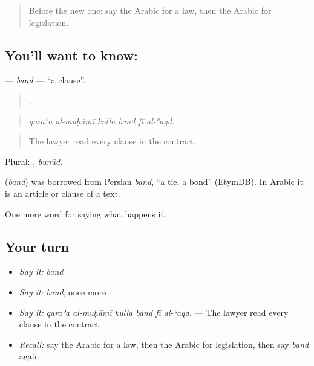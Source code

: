 \label{lesson:AR-C409-band}



\begin{quote}
Before the new one: say the Arabic for a law, then the Arabic for legislation.
\end{quote}

\subsection*{You'll want to know: }
\textbf{} — \emph{band} — \textquotedblleft{}a clause\textquotedblright{}.

\begin{quote}
     .
\end{quote}

\begin{quote}
\emph{qaraʾa al-muḥāmī kulla band fī al-ʿaqd.}
\end{quote}

\begin{quote}
The lawyer read every clause in the contract.
\end{quote}

Plural: , \emph{bunūd}.

\begin{cousinweb}
\textbf{} (\emph{band}) was borrowed from Persian \emph{band}, \textquotedblleft{}a tie, a bond\textquotedblright{} (EtymDB). In Arabic it is an article or clause of a text.
\end{cousinweb}

\begin{grammarlens}[title={What you've built}]
One more word for saying what happens if.
\end{grammarlens}

\subsection*{Your turn}
\begin{itemize}
\raggedright
  \item \emph{Say it:} \emph{band}
  \item \emph{Say it:} \emph{band}, once more
  \item \emph{Say it:} \emph{qaraʾa al-muḥāmī kulla band fī al-ʿaqd.} — The lawyer read every clause in the contract.
  \item \emph{Recall:} say the Arabic for a law, then the Arabic for legislation, then say \emph{band} again
\end{itemize}

